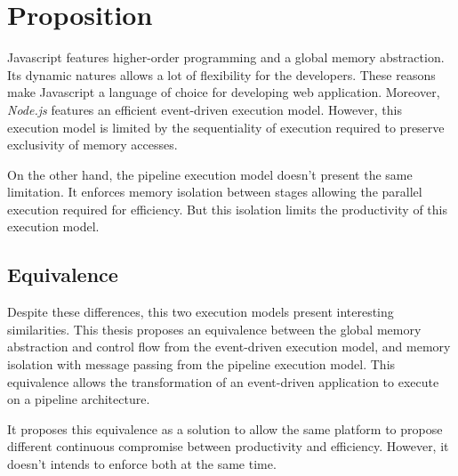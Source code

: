 \section{Proposition} \label{chapter4:proposition}

Javascript features higher-order programming and a global memory abstraction.
Its dynamic natures allows a lot of flexibility for the developers.
These reasons make Javascript a language of choice for developing web application.
Moreover, \textit{Node.js} features an efficient event-driven execution model.
However, this execution model is limited by the sequentiality of execution required to preserve exclusivity of memory accesses.

On the other hand, the pipeline execution model doesn't present the same limitation.
It enforces memory isolation between stages allowing the parallel execution required for efficiency.
But this isolation limits the productivity of this execution model.

\subsection{Equivalence}

Despite these differences, this two execution models present interesting similarities.
This thesis proposes an equivalence between the global memory abstraction and control flow from the event-driven execution model, and memory isolation with message passing from the pipeline execution model.
This equivalence allows the transformation of an event-driven application to execute on a pipeline architecture.

It proposes this equivalence as a solution to allow the same platform to propose different continuous compromise between productivity and efficiency.
However, it doesn't intends to enforce both at the same time.

